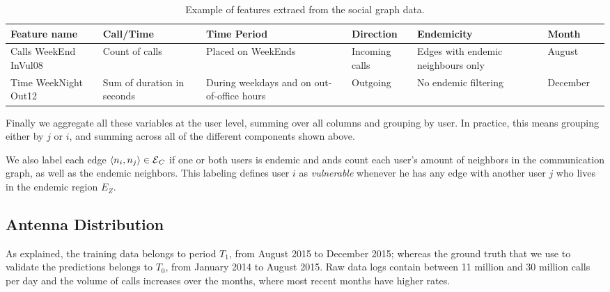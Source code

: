 \begin{table}[ht]
	\caption{Example of features extraed from the social graph data.}
	\label{tab:data_example}
	\centering
	\begin{tabular} {|p{1.5cm}|p{1.5cm}|p{2cm}|p{1.5cm}|p{2cm}|p{1.5cm}|p{1cm}}
		\toprule
		Feature name & Call/Time & Time Period & Direction & Endemicity & Month\\
		\midrule
		Calls WeekEnd InVul08       & Count of calls & Placed on WeekEnds & Incoming calls & Edges with endemic neighbours only & August\\
		\midrule
		Time WeekNight Out12 & Sum of duration in seconds & During weekdays and on out-of-office hours & Outgoing   & No endemic filtering   & December \\

		\bottomrule
	\end{tabular}
\end{table}



Finally we aggregate all these variables at the user level, summing over all columns and grouping by user.
In practice, this means grouping either by $j$ or $i$, and summing across all of the different components shown above.

We also label each edge $\left< n_i, n_j \right> \in \operatorname{\mathcal{E}}_C$ if one or both users is endemic and
ands count each user's amount of neighbors in the communication graph, as well as the endemic neighbors. This labeling defines user $i$ as \textit{vulnerable} whenever he has any edge with another user $j$ who lives in the endemic region $E_Z$.



\subsection{Antenna Distribution}\label{subsection:antenna_distribution}

As explained, the training data belongs to period $T_1$, from August 2015 to December 2015;
whereas the ground truth that we use to validate the predictions belongs to $T_0$, from January 2014 to August 2015. Raw data logs contain between 11 million and 30 million calls per day and the volume of calls increases over the months, where most recent months have higher rates.

